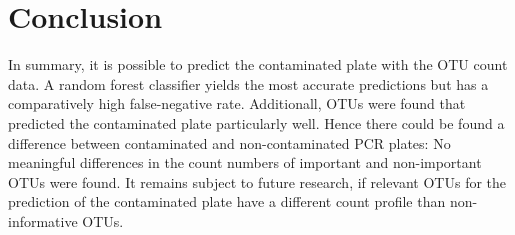 \documentclass{svproc}
\begin{document}
\section{Conclusion}
%
In summary, it is possible to predict the contaminated plate with the OTU count data. A random forest classifier yields the most accurate predictions but has a comparatively high false-negative rate. Additionall, OTUs were found that predicted the contaminated plate particularly well. Hence there could be found a difference between contaminated and non-contaminated PCR plates: No meaningful differences in the count numbers of important and non-important OTUs were found. It remains subject to future research, if relevant OTUs for the prediction of the contaminated plate have a different count profile than non-informative OTUs. 

%
%
%


\end{document}
